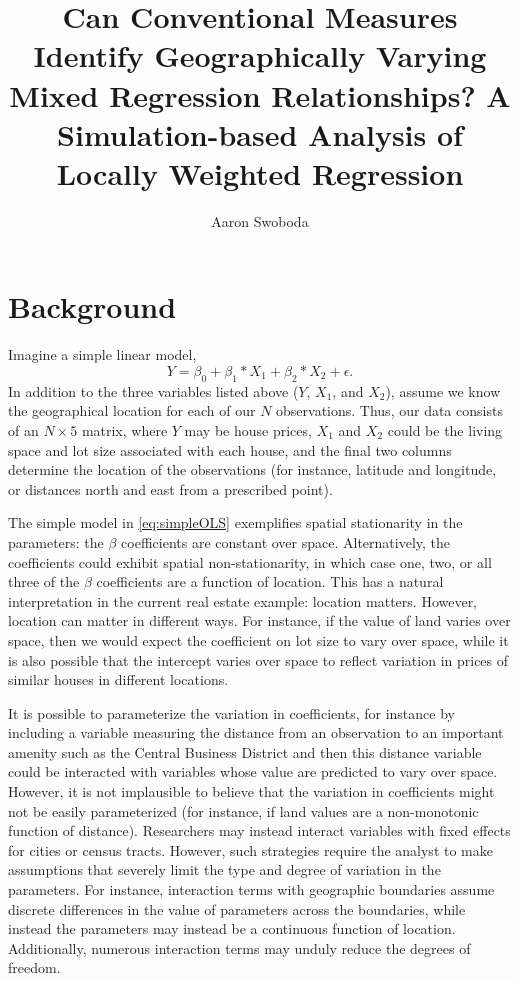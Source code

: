\documentclass{article}\usepackage[]{graphicx}\usepackage[]{color}
\title{Can Conventional Measures Identify Geographically Varying Mixed Regression Relationships? A Simulation-based Analysis of Locally Weighted Regression}
\author{Aaron Swoboda}
\begin{document}
\maketitle







\section{Background}

Imagine a simple linear model,
\begin{equation}\label{eq:simpleOLS}
Y = \beta _0 + \beta _1 *X_1 + \beta _2 * X_2 + \epsilon .
\end{equation}
In addition to the three variables listed above ($Y$, $X_1$, and $X_2$), assume we know the geographical location for each of our $N$ observations. Thus, our data consists of an $N \times 5$ matrix, where $Y$ may be house prices, $X_1$ and $X_2$ could be the living space and lot size associated with each house, and the final two columns determine the location of the observations (for instance, latitude and longitude, or distances north and east from a prescribed point).

The simple model in \eqref{eq:simpleOLS} exemplifies spatial stationarity in the parameters: the $\beta$ coefficients are constant over space. Alternatively, the coefficients could exhibit spatial non-stationarity, in which case one, two, or all three of the $\beta$ coefficients are a function of location. This has a natural interpretation in the current real estate example: location matters. However, location can matter in different ways. For instance, if the value of land varies over space, then we would expect the coefficient on lot size to vary over space, while it is also possible that the intercept varies over space to reflect variation in prices of similar houses in different locations. 

It is possible to parameterize the variation in coefficients, for instance by including a variable measuring the distance from an observation to an important amenity such as the Central Business District and then this distance variable could be interacted with variables whose value are predicted to vary over space. However, it is not implausible to believe that the variation in coefficients might not be easily parameterized (for instance, if land values are a non-monotonic function of distance). Researchers may instead interact variables with fixed effects for cities or census tracts. However, such strategies require the analyst to make assumptions that severely limit the type and degree of variation in the parameters. For instance, interaction terms with geographic boundaries assume discrete differences in the value of parameters across the boundaries, while instead the parameters may instead be a continuous function of location. Additionally, numerous interaction terms may unduly reduce the degrees of freedom.
\end{document}
